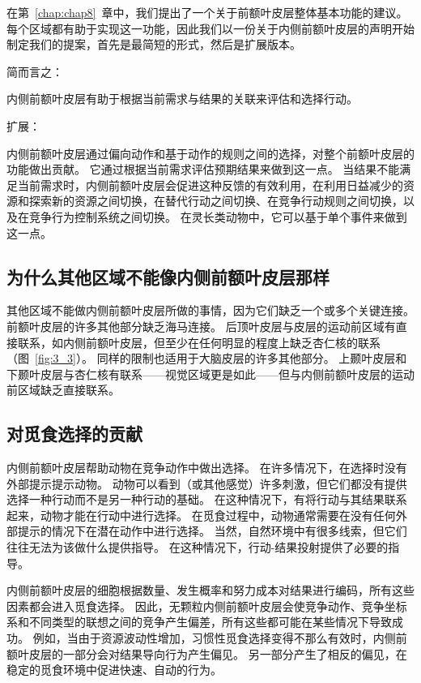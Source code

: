 在第~\ref{chap:chap8}~章中，我们提出了一个关于前额叶皮层整体基本功能的建议。
每个区域都有助于实现这一功能，因此我们以一份关于内侧前额叶皮层的声明开始制定我们的提案，首先是最简短的形式，然后是扩展版本。\par


简而言之：\par
内侧前额叶皮层有助于根据当前需求与结果的关联来评估和选择行动。\par
扩展：\par
内侧前额叶皮层通过偏向动作和基于动作的规则之间的选择，对整个前额叶皮层的功能做出贡献。
它通过根据当前需求评估预期结果来做到这一点。
当结果不能满足当前需求时，内侧前额叶皮层会促进这种反馈的有效利用，在利用日益减少的资源和探索新的资源之间切换，在替代行动之间切换、在竞争行动规则之间切换，以及在竞争行为控制系统之间切换。
在灵长类动物中，它可以基于单个事件来做到这一点。\par



\subsection{为什么其他区域不能像内侧前额叶皮层那样}

其他区域不能做内侧前额叶皮层所做的事情，因为它们缺乏一个或多个关键连接。
前额叶皮层的许多其他部分缺乏海马连接。
后顶叶皮层与皮层的运动前区域有直接联系，如内侧前额叶皮层，但至少在任何明显的程度上缺乏杏仁核的联系（图~\ref{fig:3_3}）。
同样的限制也适用于大脑皮层的许多其他部分。
上颞叶皮层和下颞叶皮层与杏仁核有联系——视觉区域更是如此——但与内侧前额叶皮层的运动前区域缺乏直接联系。\par



\subsection{对觅食选择的贡献}

内侧前额叶皮层帮助动物在竞争动作中做出选择。
在许多情况下，在选择时没有外部提示提示动物。
动物可以看到（或其他感觉）许多刺激，但它们都没有提供选择一种行动而不是另一种行动的基础。
在这种情况下，有将行动与其结果联系起来，动物才能在行动中进行选择。
在觅食过程中，动物通常需要在没有任何外部提示的情况下在潜在动作中进行选择。
当然，自然环境中有很多线索，但它们往往无法为该做什么提供指导。
在这种情况下，行动-结果投射提供了必要的指导。\par


内侧前额叶皮层的细胞根据数量、发生概率和努力成本对结果进行编码，所有这些因素都会进入觅食选择。
因此，无颗粒内侧前额叶皮层会使竞争动作、竞争坐标系和不同类型的联想之间的竞争产生偏差，所有这些都可能在某些情况下导致成功。
例如，当由于资源波动性增加，习惯性觅食选择变得不那么有效时，内侧前额叶皮层的一部分会对结果导向行为产生偏见。
另一部分产生了相反的偏见，在稳定的觅食环境中促进快速、自动的行为。\par


